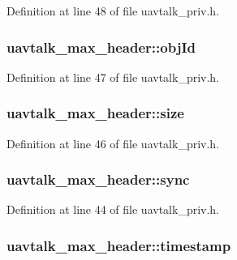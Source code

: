 Definition at line 48 of file uavtalk\-\_\-priv.\-h.

\hypertarget{structuavtalk__max__header_ae86ac377823746b4ec927b0bf9d7d79b}{
\subsubsection[{obj\-Id}]{ uavtalk\-\_\-max\-\_\-header\-::obj\-Id}}\label{structuavtalk__max__header_ae86ac377823746b4ec927b0bf9d7d79b}


Definition at line 47 of file uavtalk\-\_\-priv.\-h.

\hypertarget{structuavtalk__max__header_a8c446383de21042da34e0f6e2900772a}{
\subsubsection[{size}]{ uavtalk\-\_\-max\-\_\-header\-::size}}\label{structuavtalk__max__header_a8c446383de21042da34e0f6e2900772a}


Definition at line 46 of file uavtalk\-\_\-priv.\-h.

\hypertarget{structuavtalk__max__header_a345956ffa399c59404b4e1523001759a}{
\subsubsection[{sync}]{ uavtalk\-\_\-max\-\_\-header\-::sync}}\label{structuavtalk__max__header_a345956ffa399c59404b4e1523001759a}


Definition at line 44 of file uavtalk\-\_\-priv.\-h.

\hypertarget{structuavtalk__max__header_a9dcfa0653337ea23ff5de9ba704d8db7}{
\subsubsection[{timestamp}]{ uavtalk\-\_\-max\-\_\-header\-::timestamp}}\label{structuavtalk__max__header_a9dcfa0653337ea23ff5de9ba704d8db7}


